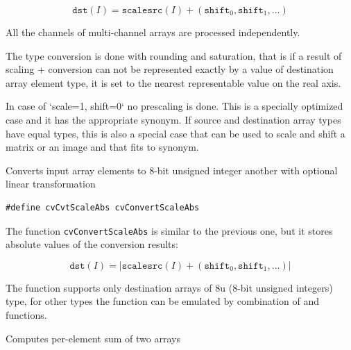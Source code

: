 \[
\texttt{dst}(I) = \texttt{scale} \texttt{src}(I) + (\texttt{shift}_0,\texttt{shift}_1,...)
\]

All the channels of multi-channel arrays are processed independently.

The type conversion is done with rounding and saturation, that is if a
result of scaling + conversion can not be represented exactly by a value
of destination array element type, it is set to the nearest representable
value on the real axis.

In case of `scale=1, shift=0` no prescaling is done. This is a specially
optimized case and it has the appropriate  synonym. If
source and destination array types have equal types, this is also a
special case that can be used to scale and shift a matrix or an image
and that fits to  synonym.

\label{ConvertScaleAbs}

Converts input array elements to 8-bit unsigned integer another with optional linear transformation


\begin{lstlisting}
#define cvCvtScaleAbs cvConvertScaleAbs
\end{lstlisting}

\begin{description}
\end{description}


The function \texttt{cvConvertScaleAbs} is similar to the previous one, but it stores absolute values of the conversion results:

\[
\texttt{dst}(I) = |\texttt{scale} \texttt{src}(I) + (\texttt{shift}_0,\texttt{shift}_1,...)|
\]

The function supports only destination arrays of 8u (8-bit unsigned integers) type, for other types the function can be emulated by combination of  and  functions.

\label{Add}

Computes per-element sum of two arrays


